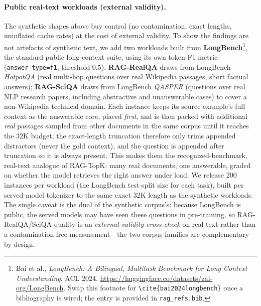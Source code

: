 \paragraph{Public real-text workloads (external validity).}
The synthetic shapes above buy control (no contamination, exact lengths,
uninflated cache rates) at the cost of external validity. To show the findings are
not artefacts of synthetic text, we add two workloads built from
\textbf{LongBench}\footnote{Bai et al., \emph{LongBench: A Bilingual, Multitask
Benchmark for Long Context Understanding}, ACL 2024.
\url{https://huggingface.co/datasets/zai-org/LongBench}. Swap this footnote for
\texttt{\textbackslash cite\{bai2024longbench\}} once a bibliography is wired; the
entry is provided in \texttt{rag\_refs.bib}.}, the standard public long-context
suite, using its own token-F1 metric (\texttt{answer\_type{=}f1}, threshold $0.5$).
\textbf{RAG-RealQA} draws from LongBench \emph{HotpotQA} (real multi-hop questions
over real Wikipedia passages, short factual answers); \textbf{RAG-SciQA} draws from
LongBench \emph{QASPER} (questions over real NLP research papers, including
abstractive and unanswerable cases) to cover a non-Wikipedia technical domain.
Each instance keeps its source example's full context as the answerable core,
placed \emph{first}, and is then packed with additional \emph{real} passages
sampled from other documents in the same corpus until it reaches the $32$K budget;
the exact-length truncation therefore only trims appended distractors (never the
gold context), and the question is appended after truncation so it is always
present. This makes them the recognized-benchmark, real-text analogue of RAG-TopK:
many real documents, one answerable, graded on whether the model retrieves the
right answer under load. We release $200$ instances per workload (the LongBench
test-split size for each task), built per served-model tokenizer to the same exact
$32$K length as the synthetic workloads. The single caveat is the dual of the
synthetic corpus's: because LongBench is public, the served models may have seen
these questions in pre-training, so RAG-RealQA/SciQA quality is an
\emph{external-validity cross-check} on real text rather than a contamination-free
measurement---the two corpus families are complementary by design.
